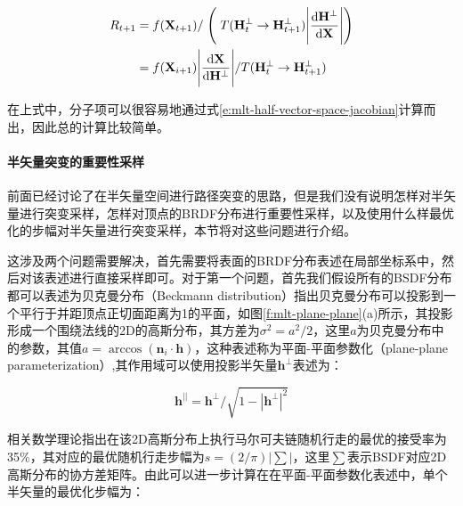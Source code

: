 \begin{equation}
\begin{aligned}
	R_{t+1}&=f(\mathbf{X}_{t+1})/\Biggm(T(\mathbf{H}^{\perp}_t\to\mathbf{H}^{\perp}_{t+1})\Biggl|\frac{{\rm d}\mathbf{H}^{\perp}}{{\rm d}\mathbf{X}}\Biggl|\Biggm)\\
	&=f(\mathbf{X}_{i+1})\Biggl|\frac{{\rm d}\mathbf{X}}{{\rm d}\mathbf{H}^{\perp}}\Biggl|/T(\mathbf{H}^{\perp}_t\to\mathbf{H}^{\perp}_{t+1})
\end{aligned}
\end{equation}

\noindent 在上式中，分子项可以很容易地通过式\ref{e:mlt-half-vector-space-jacobian}计算而出，因此总的计算比较简单。





\paragraph{半矢量突变的重要性采样}
前面已经讨论了在半矢量空间进行路径突变的思路，但是我们没有说明怎样对半矢量进行突变采样，怎样对顶点的BRDF分布进行重要性采样，以及使用什么样最优化的步幅对半矢量进行突变采样，本节将对这些问题进行介绍。

这涉及两个问题需要解决，首先需要将表面的BRDF分布表述在局部坐标系中，然后对该表述进行直接采样即可。对于第一个问题，首先我们假设所有的BSDF分布都可以表述为贝克曼分布（Beckmann distribution）\cite{a:Bidirectionalalightcuts,a:TheScatteringofElectromagneticWavesfromRoughSurfaces,a:AReflectanceModelforComputerGraphics}指出贝克曼分布可以投影到一个平行于并距顶点正切面距离为1的平面，如图\ref{f:mlt-plane-plane}(a)所示，其投影形成一个围绕法线的2D的高斯分布，其方差为$\sigma^{2}=a^{2}/2$，这里$a$为贝克曼分布中的参数，其值$a=\arccos(\mathbf{n}_i\cdot\mathbf{h})$，这种表述称为平面-平面参数化（plane-plane parameterization）,其作用域可以使用投影半矢量$\mathbf{h}^{\perp}$表述为：

\begin{equation}\label{e:mlt-parallel-half-vector}
	\mathbf{h}^{||}=\mathbf{h}^{\perp}/\sqrt{1-|\mathbf{h}^{\perp}|^{2}}
\end{equation}

相关数学理论\cite{b:MarkovChains:GibbsFieldsMonteCarloSimulationandQueues}指出在该2D高斯分布上执行马尔可夫链随机行走的最优的接受率为35\%，其对应的最优随机行走步幅为$s=(2/\pi)|\sum|$，这里$\sum$表示BSDF对应2D高斯分布的协方差矩阵。由此可以进一步计算在在平面-平面参数化表述中，单个半矢量的最优化步幅为：

